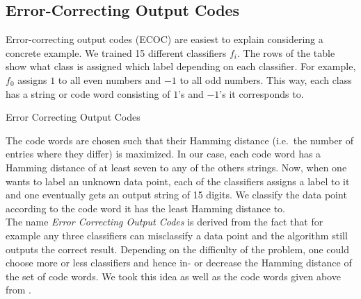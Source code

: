 \subsection{Error-Correcting Output Codes}\label{sec:ecoc}
Error-correcting output codes (ECOC) are easiest to explain considering a concrete example. We trained 15 different classifiers $f_i$. The rows of the table show what class is assigned which label depending on each classifier. For example, $f_0$ assigns $1$ to all even numbers and $-1$ to all odd numbers. This way, each class has a string or code word consisting of $1$'s and $-1$'s it corresponds to.

\begin{table}[ht!]
	\centering
	\caption{Error Correcting Output Codes}
	\label{Codewords}
	
\end{table}  

The code words are chosen such that their Hamming distance (i.e.\ the number of entries where they differ) is maximized. In our case, each code word has a Hamming distance of at least seven to any of the others strings. Now, when one wants to label an unknown data point, each of the classifiers assigns a label to it and one eventually gets an output string of 15 digits. We classify the data point according to the code word it has the least Hamming distance to.\\
The name \textit{Error Correcting Output Codes} is derived from the fact that for example any three classifiers can misclassify a data point and the algorithm still outputs the correct result. Depending on the difficulty of the problem, one could choose more or less classifiers and hence in- or decrease the Hamming distance of the set of code words. We took this idea as well as the code words given above from \cite{dietterich1995solving}.


